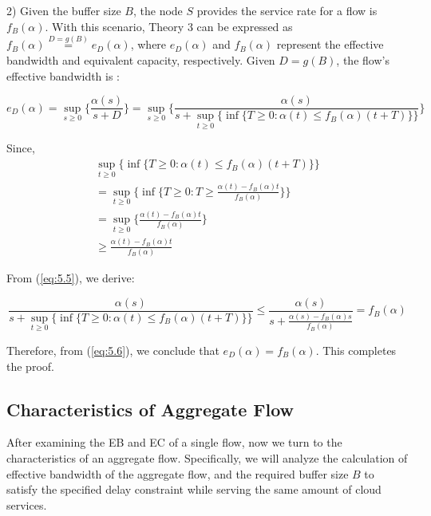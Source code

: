\documentclass[a4paper]{article}
\begin{document}
2)  Given the buffer size $B$, the node $S$ provides the service rate for a flow is ${f_B}(\alpha )$. With this scenario, Theory 3 can be expressed as ${f_B}(\alpha )\mathop  = \limits^{D = g(B)} {e_D}(\alpha )$, where ${e_D}(\alpha )$ and ${f_B}(\alpha )$ represent the effective bandwidth and equivalent capacity, respectively. Given $D = g(B)$, the flow’s effective bandwidth is :

\begin{equation}
{e_D}(\alpha ) = {\sup _{s \ge 0}}\{ \frac{{\alpha (s)}}{{s + D}}\}  = {\sup _{s \ge 0}}\{ \frac{{\alpha (s)}}{{s + {{\sup }_{t \ge 0}}\{ \inf \{ T \ge 0:\alpha (t) \le {f_B}(\alpha )(t + T)\} \} }}\}
\label{eq:5.4}
\end{equation}

Since,
\begin{equation}
\begin{array}{l}
{\sup _{t \ge 0}}\{ \inf \{ T \ge 0:\alpha (t) \le {f_B}(\alpha )(t + T)\} \} \\
 = {\sup _{t \ge 0}}\{ \inf \{ T \ge 0:T \ge \frac{{\alpha (t) - {f_B}(\alpha )t}}{{{f_B}(\alpha )}}\} \} \\
 = {\sup _{t \ge 0}}\{ \frac{{\alpha (t) - {f_B}(\alpha )t}}{{{f_B}(\alpha )}}\} \\
 \ge \frac{{\alpha (t) - {f_B}(\alpha )t}}{{{f_B}(\alpha )}}
\label{eq:5.5}
\end{array}
\end{equation}

From (\ref{eq:5.5}), we derive:

\begin{equation}
\frac{{\alpha (s)}}{{s + {{\sup }_{t \ge 0}}\{ \inf \{ T \ge 0:\alpha (t) \le {f_B}(\alpha )(t + T)\} \} }} \le \frac{{\alpha (s)}}{{s + \frac{{\alpha (s) - {f_B}(\alpha )s}}{{{f_B}(\alpha )}}}} = {f_B}(\alpha )
\label{eq:5.6}
\end{equation}

Therefore, from (\ref{eq:5.6}), we conclude that ${e_D}(\alpha ) = {f_B}(\alpha )$. This completes the proof.

\subsection{Characteristics of Aggregate Flow}

After examining the EB and EC of a single flow, now we turn to the characteristics of an aggregate flow. Specifically, we will analyze the calculation of effective bandwidth of the aggregate flow, and the required buffer size $B$ to satisfy the specified delay constraint while serving the same amount of cloud services.
\end{document}
